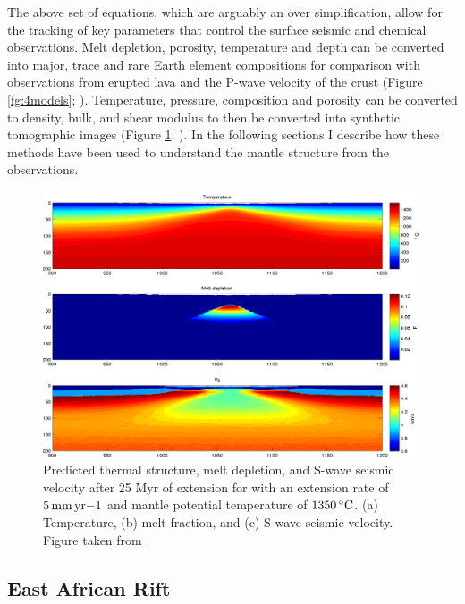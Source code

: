 The above set of equations, which are arguably an over simplification, allow for the tracking of key parameters that control the surface seismic and chemical observations. Melt depletion, porosity, temperature and depth can be converted into major, trace and rare Earth element compositions for comparison with observations from erupted lava and the P-wave velocity of the crust (Figure \ref{fg:4models}; \citealp{armitage-etal-2008,armitage-etal-2009,armitage-etal-2010,armitage-etal-g3-2011,armitage-etal-epsl-2015,armitage-etal-g3-2018,armitage-etal-grl-2019}). Temperature, pressure, composition and porosity can be converted to density, bulk, and shear modulus to then be converted into synthetic tomographic images (Figure \ref{fg:mantleVs}; \citealp{goes-etal-2012,armitage-etal-epsl-2015,armitage-etal-g3-2018,armitage-etal-grl-2019}). In the following sections I describe how these methods have been used to understand the mantle structure from the observations.

\begin{figure}
\centering
\includegraphics[width=\textwidth]{./figures/ch2-mantleVs.pdf}
\caption{Predicted thermal structure, melt depletion, and S-wave seismic velocity after 25 Myr of extension for with an extension rate of $5\rm\,mm\,yr{-1}$ and mantle potential temperature of $1350\rm\,^{\circ}C$. (a) Temperature, (b) melt fraction, and (c) S-wave seismic velocity. Figure taken from \cite{armitage-etal-g3-2018}.}
\label{fg:mantleVs}
\end{figure}

\subsection{East African Rift}

